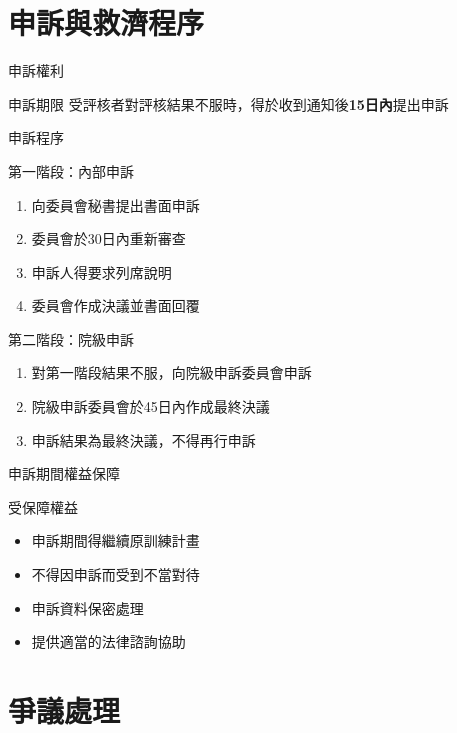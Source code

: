 \documentclass[aspectratio=169,12pt]{beamer}
\begin{document}
\section{申訴與救濟程序}

\begin{frame}{申訴權利}
\begin{alertblock}{申訴期限}
受評核者對評核結果不服時，得於收到通知後\textbf{15日內}提出申訴
\end{alertblock}
\end{frame}

\begin{frame}{申訴程序}
\begin{block}{第一階段：內部申訴}
\begin{enumerate}
    \item 向委員會秘書提出書面申訴
    \item 委員會於30日內重新審查
    \item 申訴人得要求列席說明
    \item 委員會作成決議並書面回覆
\end{enumerate}
\end{block}

\begin{block}{第二階段：院級申訴}
\begin{enumerate}
    \item 對第一階段結果不服，向院級申訴委員會申訴
    \item 院級申訴委員會於45日內作成最終決議
    \item 申訴結果為最終決議，不得再行申訴
\end{enumerate}
\end{block}
\end{frame}

\begin{frame}{申訴期間權益保障}
\begin{exampleblock}{受保障權益}
\begin{itemize}
    \item 申訴期間得繼續原訓練計畫
    \item 不得因申訴而受到不當對待
    \item 申訴資料保密處理
    \item 提供適當的法律諮詢協助
\end{itemize}
\end{exampleblock}
\end{frame}

\section{爭議處理}
\end{document}
